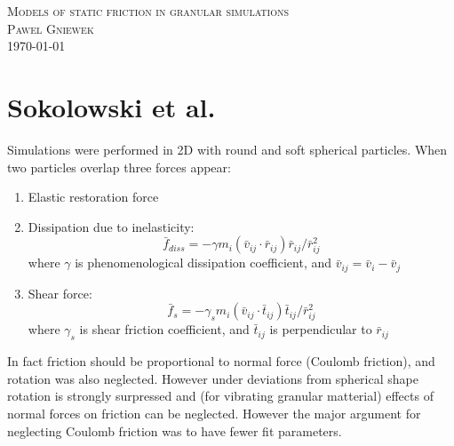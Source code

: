 \documentclass[10pt,a4paper]{article}
\begin{document}
\begin{center}
\textsc{\Large Models of static friction in granular simulations}\\[1.0cm]
\textsc{\LARGE Pawel Gniewek}\\[1.0cm]
\vspace{0.5cm}
\today

\end{center}

\newpage

\section{Sokolowski et al. \cite{sok92, sok93}}
Simulations were performed in 2D with round and soft spherical particles. When two particles overlap three forces appear:
\begin{enumerate}
 \item Elastic restoration force
 \item Dissipation due to inelasticity:
 \begin{equation}
  \bar{f}_{diss} = -\gamma m_i (\bar{v}_{ij}\cdot \bar{r}_{ij})\bar{r}_{ij} / \bar{r}^2_{ij}
 \end{equation}
 where $\gamma$ is phenomenological dissipation coefficient, and $\bar{v}_{ij} = \bar{v}_{i} - \bar{v}_{j}$
 \item Shear force:
 \begin{equation}
  \bar{f}_{s} = -\gamma_s m_i (\bar{v}_{ij}\cdot \bar{t}_{ij})\bar{t}_{ij} / \bar{r}^2_{ij}
 \end{equation}
 where $\gamma_s$ is shear friction coefficient, and $\bar{t}_{ij}$ is perpendicular to $\bar{r}_{ij}$
\end{enumerate}

In fact friction should be proportional to normal force (Coulomb friction), and rotation was also neglected. 
However under deviations from spherical shape rotation is strongly surpressed and (for vibrating granular matterial)
effects of normal forces on friction can be neglected. However the major argument for neglecting Coulomb friction was 
to have fewer fit parameters.
\end{document}
